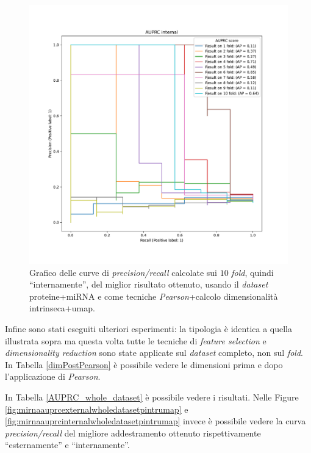 \documentclass[12pt,italian]{report}
\begin{document}
	\begin{figure}[h!]
		\centering
		\includegraphics[width=0.9\linewidth]{"immagini/proteins_mirna_AUPRC_Internal_max_result_on _fold"}
		\caption{Grafico delle curve di \textit{precision/recall} calcolate sui $10$ \textit{fold}, quindi ``internamente'', del miglior risultato ottenuto, usando il \textit{dataset} proteine+miRNA e come tecniche \textit{Pearson}+calcolo dimensionalità intrinseca+umap.}
		\label{fig:proteinsmirnaauprcinternalmaxresulton-fold}
	\end{figure}
	
	Infine sono stati eseguiti ulteriori esperimenti: la tipologia è identica a quella illustrata sopra ma questa volta tutte le tecniche di \textit{feature selection} e \textit{dimensionality reduction} sono state applicate sul \textit{dataset} completo, non sul \textit{fold}. 
	In Tabella \ref{dimPostPearson} è possibile vedere le dimensioni prima e dopo l'applicazione di \textit{Pearson}. 
	
	In Tabella \ref{AUPRC_whole_dataset} è possibile vedere i risultati. Nelle Figure  \ref{fig:mirnaauprcexternalwholedatasetpintrumap} e \ref{fig:mirnaauprcinternalwholedatasetpintrumap} invece è possibile vedere la curva \textit{precision/recall} del migliore addestramento ottenuto rispettivamente ``esternamente'' e ``internamente''. 
	
\end{document}
